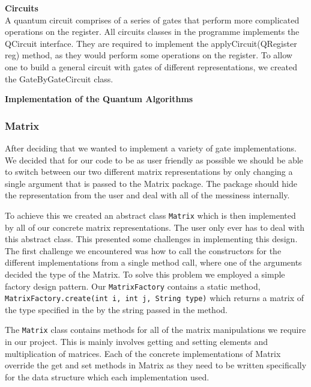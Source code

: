 \documentclass[bibliography=totocnumbered, 10pt]{article}
\theoremstyle{NoticeStyle}
\begin{document}
\begin{myenumerate}
	\item \textbf{Circuits}\\
	A quantum circuit comprises of a series of gates that perform more complicated operations on the register. All circuits classes in the programme implements the QCircuit interface. They are required to implement the applyCircuit(QRegister reg) method, as they would perform some operations on the register. To allow one to build a general circuit with gates of different representations, we created the GateByGateCircuit class. 
	
	\item \textbf{Implementation of the Quantum Algorithms}\\
	
\end{myenumerate}

\subsubsection{Matrix}
After deciding that we wanted to implement a variety of gate implementations. We decided that for our code to be as user friendly as possible we should be able to switch between our two different matrix representations by only changing a single argument that is passed to the Matrix package. The package should hide the representation from the user and deal with all of the messiness internally.

To achieve this we created an abstract class \texttt{Matrix} which is then implemented by all of our concrete matrix representations. The user only ever has to deal with this abstract class. This presented some challenges in implementing this design. The first challenge we encountered was how to call the constructors for the different implementations from a single method call, where one of the arguments decided the type of the Matrix. To solve this problem we employed a simple factory design pattern. Our \texttt{MatrixFactory} contains a static method, \texttt{MatrixFactory.create(int i, int j, String type)} which returns a matrix of the type specified in the by the string passed in the method.

The \texttt{Matrix} class contains methods for all of the matrix manipulations we require in our project. This is mainly involves getting and setting elements and multiplication of matrices. Each of the concrete implementations of Matrix override the get and set methods in Matrix as they need to be written specifically for the data structure which each implementation used.
\end{document}
